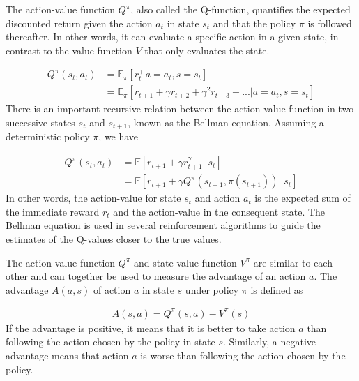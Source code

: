 \documentclass[class=book, crop=false]{standalone}
\begin{document}
The action-value function $Q^{\pi}$, also called the Q-function, quantifies the expected discounted return given the action $a_{t}$ in state $s_{t}$ and that the policy $\pi$ is followed thereafter. In other words, it can evaluate a specific action in a given state, in contrast to the value function $V$ that only evaluates the state.

\begin{equation}
   \begin{aligned}\label{eq:theory:action_value_function}
Q^{\pi}(s_{t},a_{t}) 
&= \mathbb{E}_{\pi}[r^{\gamma}_{t}|a=a_{t} ,s=s_{t}]
\\
&= \mathbb{E}_{\pi}[ r_{t+1} + \gamma r_{t+2} + \gamma^{2} r_{t+3} + ...|a=a_{t} ,s=s_{t}]
\end{aligned} 
\end{equation}
There is an important recursive relation between the action-value function in two successive states $s_{t}$ and $s_{t+1}$, known as the Bellman equation. Assuming a deterministic policy $\pi$, we have

\begin{equation}
   \begin{aligned}\label{eq:theory:bellman_equation}
Q^{\pi}(s_{t},a_{t}) 
&= \mathbb{E}[r_{t+1} +\gamma r^{\gamma}_{t+1} |\; s_{t}] \\
& = \mathbb{E}[r_{t+1} +\gamma Q^{\pi}(s_{t+1},\pi(s_{t+1}))|\; s_{t}]
\end{aligned} 
\end{equation}
In other words, the action-value for state $s_{t}$ and action $a_{t}$ is the expected sum of the immediate reward $r_{t}$ and the action-value in the consequent state. The Bellman equation is used in several reinforcement algorithms to guide the estimates of the Q-values closer to the true values.

The action-value function $Q^{\pi}$ and state-value function $V^{\pi}$ are similar to each other and can together be used to measure the advantage of an action $a$. The advantage $A(a,s)$ of action $a$ in state $s$ under policy $\pi$ is defined as 

\begin{equation}
   \begin{aligned}\label{eq:theory:advantage_function}
A(s,a) =  Q^{\pi}(s,a) - V^{\pi}(s)
\end{aligned} 
\end{equation}
If the advantage is positive, it means that it is better to take action $a$ than following the action chosen by the policy in state $s$. Similarly, a negative advantage means that action $a$ is worse than following the action chosen by the policy.
\end{document}
